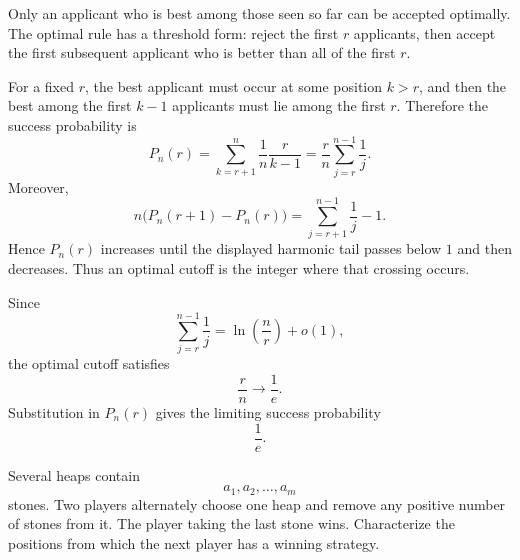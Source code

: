     \begin{solution}
        Only an applicant who is best among those seen so far can be accepted
        optimally. The optimal rule has a threshold form: reject the first $r$
        applicants, then accept the first subsequent applicant who is better
        than all of the first $r$.

        For a fixed $r$, the best applicant must occur at some position
        $k>r$, and then the best among the first $k-1$ applicants must lie among
        the first $r$. Therefore the success probability is
        \[
            P_n(r)
            =
            \sum_{k=r+1}^{n}
            \frac{1}{n}\frac{r}{k-1}
            =
            \frac{r}{n}
            \sum_{j=r}^{n-1}\frac{1}{j}.
        \]
        Moreover,
        \[
            n\bigl(P_n(r+1)-P_n(r)\bigr)
            =
            \sum_{j=r+1}^{n-1}\frac{1}{j}-1.
        \]
        Hence $P_n(r)$ increases until the displayed harmonic tail passes
        below $1$ and then decreases. Thus an optimal cutoff is the integer
        where that crossing occurs.

        Since
        \[
            \sum_{j=r}^{n-1}\frac{1}{j}
            =
            \ln\left(\frac{n}{r}\right)+o(1),
        \]
        the optimal cutoff satisfies
        \[
            \frac{r}{n}\to\frac{1}{e}.
        \]
        Substitution in $P_n(r)$ gives the limiting success probability
        \[
            \boxed{\frac{1}{e}}.
        \]
    \end{solution}

    \begin{expectedproblem}
        Several heaps contain
        \[
            a_1,a_2,\ldots,a_m
        \]
        stones. Two players alternately choose one heap and remove any positive
        number of stones from it. The player taking the last stone wins.
        Characterize the positions from which the next player has a winning
        strategy.
    \end{expectedproblem}

